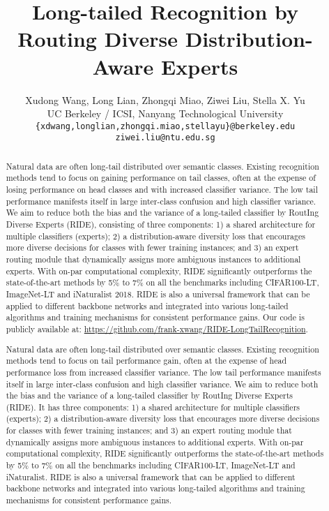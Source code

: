 \documentclass[dvipsnames]{article}
\title{Long-tailed Recognition by\\
Routing Diverse Distribution-Aware Experts}
\author{Xudong Wang, Long Lian, Zhongqi Miao, Ziwei Liu, Stella X. Yu\\
UC Berkeley / ICSI, 
Nanyang Technological University\\
\texttt{\{xdwang,longlian,zhongqi.miao,stellayu\}@berkeley.edu}\\
\texttt{ziwei.liu@ntu.edu.sg}
\\ 
}
\begin{document}
\maketitle

\begin{abstract}



Natural data are often long-tail distributed over semantic classes. Existing recognition methods tend to focus on gaining performance on tail classes, often at the expense of losing performance on head classes and with increased classifier variance. 
The low tail performance manifests itself in large inter-class confusion and high classifier variance. We aim to reduce both the bias and the variance of a long-tailed classifier by RoutIng Diverse Experts (RIDE), consisting of three components: 1) a shared architecture for multiple classifiers (experts); 2) a distribution-aware diversity loss that encourages more diverse decisions for classes with fewer training instances; and 3) an expert routing module that dynamically assigns more ambiguous instances to additional experts.  With on-par computational complexity, RIDE significantly outperforms the state-of-the-art methods by 5\% to 7\% on all the benchmarks including CIFAR100-LT, ImageNet-LT and iNaturalist 2018. RIDE is also a universal framework that can be applied to different backbone networks and integrated into various long-tailed algorithms and training mechanisms for consistent performance gains. Our code is publicly available at: \href{https://github.com/frank-xwang/RIDE-LongTailRecognition}{https://github.com/frank-xwang/RIDE-LongTailRecognition}.

\end{abstract}

\iffalse
\begin{abstract}



Natural data are often long-tail distributed over semantic classes. Existing recognition methods tend to focus on tail performance gain, often at the expense of head performance loss from increased classifier variance. The low tail performance manifests itself in large inter-class confusion and high classifier variance.  We aim to reduce both the bias and the variance of a long-tailed classifier by RoutIng Diverse Experts (RIDE). It has three components: 1) a shared architecture for multiple classifiers (experts); 2) a distribution-aware diversity loss that encourages more diverse decisions for classes with fewer training instances; and 3) an expert routing module that dynamically assigns more ambiguous instances to additional experts.  With on-par computational complexity, RIDE significantly outperforms the state-of-the-art methods by 5\% to 7\% on all the benchmarks including CIFAR100-LT, ImageNet-LT and iNaturalist. RIDE is also a universal framework that can be applied to different backbone networks and integrated into various long-tailed algorithms and training mechanisms for consistent performance gains. 

\end{abstract}
\end{document}
